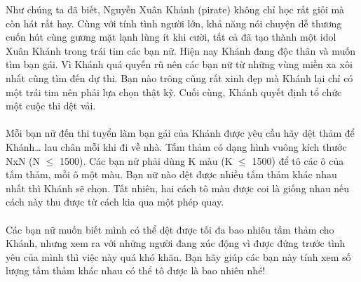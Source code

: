 Như chúng ta đã biết, Nguyễn Xuân Khánh (pirate) không chỉ học rất giỏi mà còn hát rất hay. Cùng với tính tình người lớn, khả năng nói chuyện dễ thương cuốn hút cùng gương mặt lạnh lùng ít khi cười, tất cả đã tạo thành một idol Xuân Khánh trong trái tim các bạn nữ. Hiện nay Khánh đang độc thân và muốn tìm bạn gái. Vì Khánh quá quyến rũ nên các bạn nữ từ những vùng miền xa xôi nhất cũng tìm đến dự thi. Bạn nào trông cũng rất xinh đẹp mà Khánh lại chỉ có một trái tim nên phải lựa chọn thật kỹ. Cuối cùng, Khánh quyết định tổ chức một cuộc thi dệt vải.   
\\
\\   Mỗi bạn nữ đến thi tuyển làm bạn gái của Khánh được yêu cầu hãy dệt thảm để Khánh… lau chân mỗi khi đi về nhà. Tấm thảm có dạng hình vuông kích thước NxN (N $\le$ 1500). Các bạn nữ phải dùng K màu (K $\le$ 1500) để tô các ô của tấm thảm, mỗi ô một màu. Bạn nữ nào dệt được nhiều tấm thảm khác nhau nhất thì Khánh sẽ chọn. Tất nhiên, hai cách tô màu được coi là giống nhau nếu cách này thu được từ cách kia qua một phép quay.   
\\
\\   Các bạn nữ muốn biết mình có thể dệt được tối đa bao nhiêu tấm thảm cho Khánh, nhưng xem ra với những người đang xúc động vì được đứng trước tình yêu của mình thì việc này quá khó khăn. Bạn hãy giúp các bạn này tính xem số lượng tấm thảm khác nhau có thể tô được là bao nhiêu nhé!  

\